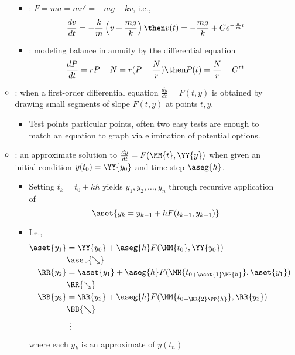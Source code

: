 \begin{itemize}
\begin{itemize}
\begin{itemize}
      \item {}: \(F = ma = mv' = -mg - kv\),
        i.e.,
        \[%
          \frac{dv}{dt} = -\frac{k}{m} \left( v + \frac{mg}{k} \right)
          \then
          v (t) = -\frac{mg}{k} + C e^{-\frac{k}{m}t}
        \]%

      \item {}: modeling balance in annuity by the
        differential equation
        \[%
          \frac{dP}{dt} = rP - N = r(P - \frac{N}{r})
          \then
          P (t) = \frac{N}{r} + C^{rt}
        \]%
    \end{itemize}

    \newpage
  \item {}: when a first-order differential equation
    \(\frac{dy}{dt} = F(t,y)\) is obtained by drawing small segments of slope
    \(F(t,y)\) at points \(t,y\).
    \begin{itemize}
      \item Test points particular points, often two easy tests are enough to
        match an equation to  graph via elimination of potential options.
    \end{itemize}

  \item {}: an approximate solution to \(\frac{dy}{dt} =
    F(\MM{t},\YY{y})\) when given an initial condition \(y(t_0) = \YY{y_0}\) and time step \(\aseg{h}\).
    \begin{itemize}
      \item Setting \(t_k = t_0 + kh\) yields \(y_1,y_2,\ldots,y_{n}\) through
        recursive application of
        \[%
          \aset{y_k = y_{k-1} + hF(t_{k-1}, y_{k-1})}
        \]%
      \item I.e.,
        \begin{align*}
          \aset{y_1} &= \YY{y_{0}} + \aseg{h}F(\MM{t_0},\YY{y_{0}}) \\
                    &\aset{\searrow} \\
          \RR{y_{2}} &= \aset{y_{1}} + \aseg{h}F(\MM{t_{0+\aset{1} \PP{h}}},\aset{y_1}) \\
                    &\RR{\searrow} \\
          \BB{y_{3}} &= \RR{y_{2}} + \aseg{h}F(\MM{t_{0+\RR{2} \PP{h}}},\RR{y_{2}}) \\
                    &\BB{\searrow} \\
                    &~\vdots
        \end{align*}
        where each \(y_k\) is an approximate of \(y(t_n)\)
    \end{itemize}


\end{itemize}
\end{itemize}
